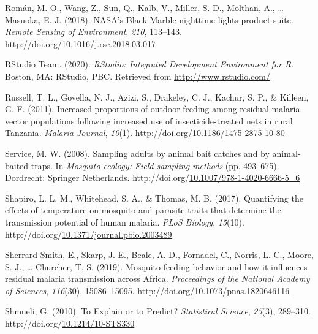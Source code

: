 \documentclass[12pt,twoside]{reedthesis}
\newlength{\cslhangindent}
\newenvironment{CSLReferences}[2] %
 {%
  \setlength{\parindent}{0pt}
  \ifodd #1 \everypar{\setlength{\hangindent}{\cslhangindent}}\ignorespaces\fi
  \ifnum #2 > 0
  \setlength{\parskip}{#2\baselineskip}
  \fi
 }%
 {}
\begin{document}
\begin{CSLReferences}{1}{0}
\leavevmode{}%
Román, M. O., Wang, Z., Sun, Q., Kalb, V., Miller, S. D., Molthan, A., \ldots{} Masuoka, E. J. (2018). {NASA}'s {Black} {Marble} nighttime lights product suite. \emph{Remote Sensing of Environment}, \emph{210}, 113--143. http://doi.org/\href{https://doi.org/10.1016/j.rse.2018.03.017}{10.1016/j.rse.2018.03.017}

\leavevmode{}%
RStudio Team. (2020). \emph{{RStudio}: {Integrated} {Development} {Environment} for {R}}. Boston, MA: RStudio, PBC. Retrieved from \url{http://www.rstudio.com/}

\leavevmode{}%
Russell, T. L., Govella, N. J., Azizi, S., Drakeley, C. J., Kachur, S. P., \& Killeen, G. F. (2011). Increased proportions of outdoor feeding among residual malaria vector populations following increased use of insecticide-treated nets in rural {Tanzania}. \emph{Malaria Journal}, \emph{10}(1). http://doi.org/\href{https://doi.org/10.1186/1475-2875-10-80}{10.1186/1475-2875-10-80}

\leavevmode{}%
Service, M. W. (2008). Sampling adults by animal bait catches and by animal-baited traps. In \emph{Mosquito ecology: Field sampling methods} (pp. 493--675). Dordrecht: Springer Netherlands. http://doi.org/\href{https://doi.org/10.1007/978-1-4020-6666-5_6}{10.1007/978-1-4020-6666-5\_6}

\leavevmode{}%
Shapiro, L. L. M., Whitehead, S. A., \& Thomas, M. B. (2017). Quantifying the effects of temperature on mosquito and parasite traits that determine the transmission potential of human malaria. \emph{PLoS Biology}, \emph{15}(10). http://doi.org/\href{https://doi.org/10.1371/journal.pbio.2003489}{10.1371/journal.pbio.2003489}

\leavevmode{}%
Sherrard-Smith, E., Skarp, J. E., Beale, A. D., Fornadel, C., Norris, L. C., Moore, S. J., \ldots{} Churcher, T. S. (2019). Mosquito feeding behavior and how it influences residual malaria transmission across {Africa}. \emph{Proceedings of the National Academy of Sciences}, \emph{116}(30), 15086--15095. http://doi.org/\href{https://doi.org/10.1073/pnas.1820646116}{10.1073/pnas.1820646116}

\leavevmode{}%
Shmueli, G. (2010). To {Explain} or to {Predict}? \emph{Statistical Science}, \emph{25}(3), 289--310. http://doi.org/\href{https://doi.org/10.1214/10-STS330}{10.1214/10-STS330}


\end{CSLReferences}
\end{document}
